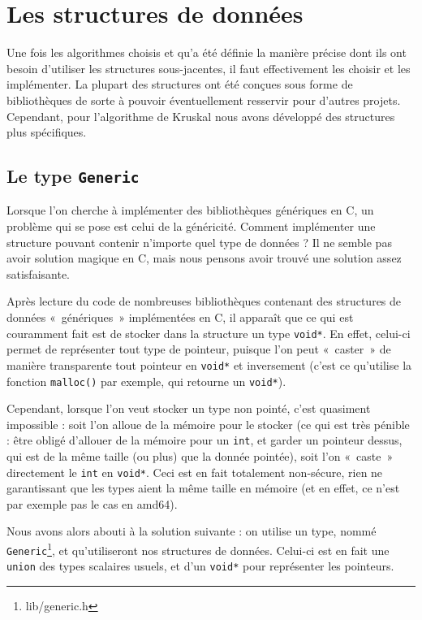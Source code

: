 \documentclass[a4paper]{article}
\begin{document}
\section{Les structures de données}

Une fois les algorithmes choisis et qu'a été définie la manière précise dont ils ont besoin d'utiliser les structures sous-jacentes, il faut effectivement les choisir et les implémenter. La plupart des structures ont été conçues sous forme de bibliothèques de sorte à pouvoir éventuellement resservir pour d'autres projets. Cependant, pour l'algorithme de {\sc Kruskal} nous avons développé des structures plus spécifiques.

\subsection{Le type \texttt{Generic}}

Lorsque l'on cherche à implémenter des bibliothèques génériques en C, un problème qui se pose est celui de la généricité. Comment implémenter une structure pouvant contenir n'importe quel type de données ? Il ne semble pas avoir solution magique en C, mais nous pensons avoir trouvé une solution assez satisfaisante.

Après lecture du code de nombreuses bibliothèques contenant des structures de données «~génériques~» implémentées en C, il apparaît que ce qui est couramment fait est de stocker dans la structure un type \texttt{void*}. En effet, celui-ci permet de représenter tout type de pointeur, puisque l'on peut «~caster~» de manière transparente tout pointeur en \texttt{void*} et inversement (c'est ce qu'utilise la fonction \texttt{malloc()} par exemple, qui retourne un \texttt{void*}).

Cependant, lorsque l'on veut stocker un type non pointé, c'est quasiment impossible : soit l'on alloue de la mémoire pour le stocker (ce qui est très pénible : être obligé d'allouer de la mémoire pour un \texttt{int}, et garder un pointeur dessus, qui est de la même taille (ou plus) que la donnée pointée), soit l'on «~caste~» directement le \texttt{int} en \texttt{void*}. Ceci est en fait totalement non-sécure, rien ne garantissant que les types aient la même taille en mémoire (et en effet, ce n'est par exemple pas le cas en amd64).

Nous avons alors abouti à la solution suivante : on utilise un type, nommé \texttt{Generic}\footnote{lib/generic.h}, et qu'utiliseront nos structures de données. Celui-ci est en fait une \texttt{union} des types scalaires usuels, et d'un \texttt{void*} pour représenter les pointeurs.
\end{document}
